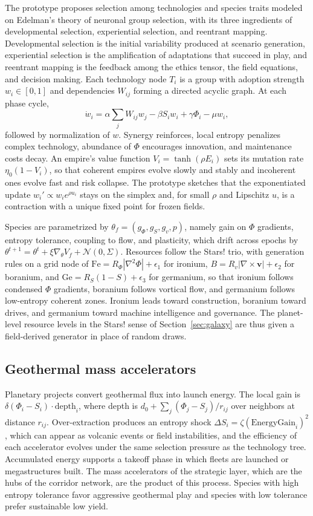 \documentclass[11pt]{article}
\begin{document}
The prototype proposes selection among technologies and species traits modeled on Edelman's theory of neuronal group selection, with its three ingredients of developmental selection, experiential selection, and reentrant mapping. Developmental selection is the initial variability produced at scenario generation, experiential selection is the amplification of adaptations that succeed in play, and reentrant mapping is the feedback among the ethics tensor, the field equations, and decision making. Each technology node $T_i$ is a group with adoption strength $w_i\in[0,1]$ and dependencies $W_{ij}$ forming a directed acyclic graph. At each phase cycle,
\[
\dot w_i=\alpha\sum_j W_{ij}w_j-\beta S_i w_i+\gamma\Phi_i-\mu w_i,
\]
followed by normalization of $w$. Synergy reinforces, local entropy penalizes complex technology, abundance of $\Phi$ encourages innovation, and maintenance costs decay. An empire's value function $V_i=\tanh(\rho E_i)$ sets its mutation rate $\eta_0(1-V_i)$, so that coherent empires evolve slowly and stably and incoherent ones evolve fast and risk collapse. The prototype sketches that the exponentiated update $w_i'\propto w_ie^{\rho u_i}$ stays on the simplex and, for small $\rho$ and Lipschitz $u$, is a contraction with a unique fixed point for frozen fields.

Species are parametrized by $\theta_f=(g_\Phi,g_S,g_v,p)$, namely gain on $\Phi$ gradients, entropy tolerance, coupling to flow, and plasticity, which drift across epochs by $\theta^{t+1}=\theta^t+\xi\nabla_\theta V_f+\mathcal{N}(0,\Sigma)$. Resources follow the Stars! trio, with generation rules on a grid node of $\mathrm{Fe}=R_\Phi|\nabla^2\Phi|+\epsilon_1$ for ironium, $B=R_v|\nabla\times\mathbf{v}|+\epsilon_2$ for boranium, and $\mathrm{Ge}=R_S(1-S)+\epsilon_3$ for germanium, so that ironium follows condensed $\Phi$ gradients, boranium follows vortical flow, and germanium follows low-entropy coherent zones. Ironium leads toward construction, boranium toward drives, and germanium toward machine intelligence and governance. The planet-level resource levels in the Stars! sense of Section~\ref{sec:galaxy} are thus given a field-derived generator in place of random draws.

\subsection{Geothermal mass accelerators}

Planetary projects convert geothermal flux into launch energy. The local gain is $\delta(\Phi_i-S_i)\cdot\mathrm{depth}_i$, where depth is $d_0+\sum_j(\Phi_j-S_j)/r_{ij}$ over neighbors at distance $r_{ij}$. Over-extraction produces an entropy shock $\Delta S_i=\zeta(\mathrm{EnergyGain}_i)^2$, which can appear as volcanic events or field instabilities, and the efficiency of each accelerator evolves under the same selection pressure as the technology tree. Accumulated energy supports a takeoff phase in which fleets are launched or megastructures built. The mass accelerators of the strategic layer, which are the hubs of the corridor network, are the product of this process. Species with high entropy tolerance favor aggressive geothermal play and species with low tolerance prefer sustainable low yield.
\end{document}
